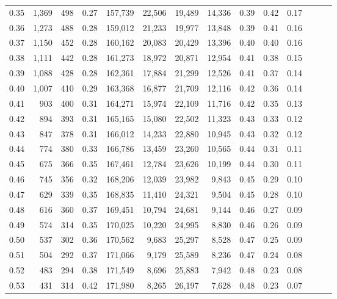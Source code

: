 \begin{tabular}{rrrrrrrrrrrrrr}
0.35 &  1,369 &  498 &  0.27 &  157,739 &   22,506 &  19,489 &  14,336 &  0.39 &  0.42 &      0.17 \\
0.36 &  1,273 &  488 &  0.28 &  159,012 &   21,233 &  19,977 &  13,848 &  0.39 &  0.41 &      0.16 \\
0.37 &  1,150 &  452 &  0.28 &  160,162 &   20,083 &  20,429 &  13,396 &  0.40 &  0.40 &      0.16 \\
0.38 &  1,111 &  442 &  0.28 &  161,273 &   18,972 &  20,871 &  12,954 &  0.41 &  0.38 &      0.15 \\
0.39 &  1,088 &  428 &  0.28 &  162,361 &   17,884 &  21,299 &  12,526 &  0.41 &  0.37 &      0.14 \\
0.40 &  1,007 &  410 &  0.29 &  163,368 &   16,877 &  21,709 &  12,116 &  0.42 &  0.36 &      0.14 \\
0.41 &    903 &  400 &  0.31 &  164,271 &   15,974 &  22,109 &  11,716 &  0.42 &  0.35 &      0.13 \\
0.42 &    894 &  393 &  0.31 &  165,165 &   15,080 &  22,502 &  11,323 &  0.43 &  0.33 &      0.12 \\
0.43 &    847 &  378 &  0.31 &  166,012 &   14,233 &  22,880 &  10,945 &  0.43 &  0.32 &      0.12 \\
0.44 &    774 &  380 &  0.33 &  166,786 &   13,459 &  23,260 &  10,565 &  0.44 &  0.31 &      0.11 \\
0.45 &    675 &  366 &  0.35 &  167,461 &   12,784 &  23,626 &  10,199 &  0.44 &  0.30 &      0.11 \\
0.46 &    745 &  356 &  0.32 &  168,206 &   12,039 &  23,982 &   9,843 &  0.45 &  0.29 &      0.10 \\
0.47 &    629 &  339 &  0.35 &  168,835 &   11,410 &  24,321 &   9,504 &  0.45 &  0.28 &      0.10 \\
0.48 &    616 &  360 &  0.37 &  169,451 &   10,794 &  24,681 &   9,144 &  0.46 &  0.27 &      0.09 \\
0.49 &    574 &  314 &  0.35 &  170,025 &   10,220 &  24,995 &   8,830 &  0.46 &  0.26 &      0.09 \\
0.50 &    537 &  302 &  0.36 &  170,562 &    9,683 &  25,297 &   8,528 &  0.47 &  0.25 &      0.09 \\
0.51 &    504 &  292 &  0.37 &  171,066 &    9,179 &  25,589 &   8,236 &  0.47 &  0.24 &      0.08 \\
0.52 &    483 &  294 &  0.38 &  171,549 &    8,696 &  25,883 &   7,942 &  0.48 &  0.23 &      0.08 \\
0.53 &    431 &  314 &  0.42 &  171,980 &    8,265 &  26,197 &   7,628 &  0.48 &  0.23 &      0.07 \\

\end{tabular}
